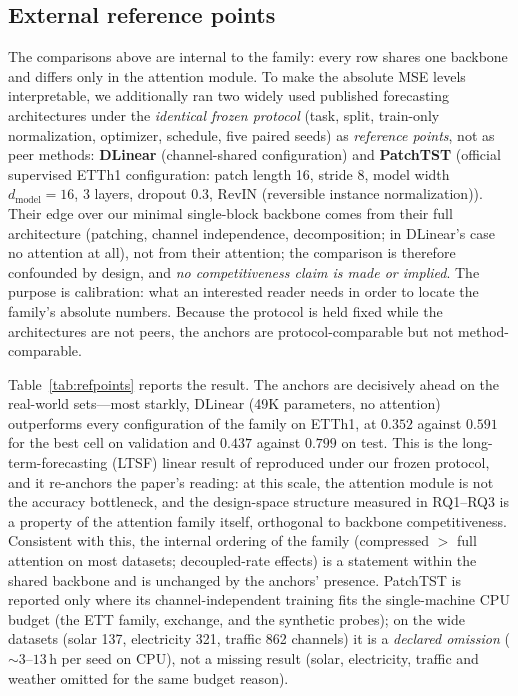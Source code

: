 \subsection{External reference points}
\label{sec:refpoints}
The comparisons above are internal to the family: every row shares one
backbone and differs only in the attention module. To make the absolute
MSE levels interpretable, we additionally ran two widely used published
forecasting architectures under the \emph{identical frozen protocol} (task,
split, train-only normalization, optimizer, schedule, five paired seeds) as
\emph{reference points}, not as peer methods: \textbf{DLinear}
\citep{zeng2023dlinear} (channel-shared configuration) and \textbf{PatchTST}
\citep{nie2023patchtst} (official supervised ETTh1 configuration: patch
length 16, stride 8, model width $d_{\mathrm{model}}=16$, 3 layers, dropout
0.3, RevIN (reversible instance normalization)). Their edge
over our minimal single-block backbone comes from their full architecture
(patching, channel independence, decomposition; in DLinear's case no
attention at all), not from their attention; the comparison is therefore
confounded by design, and \emph{no competitiveness claim is made or
implied}. The purpose is calibration: what an interested reader needs in
order to locate the family's absolute numbers. Because the protocol is held
fixed while the architectures are not peers, the anchors are
protocol-comparable but not method-comparable.

Table~\ref{tab:refpoints} reports the result. The anchors are decisively
ahead on the real-world sets---most starkly, DLinear (49K parameters, no
attention) outperforms every configuration of the family on ETTh1, at $0.352$
against $0.591$ for the best cell on validation and $0.437$ against $0.799$ on
test. This is the long-term-forecasting (LTSF) linear result of \citet{zeng2023dlinear}
reproduced under our frozen protocol, and it re-anchors the paper's reading:
at this scale, the attention module is not the accuracy bottleneck, and the
design-space structure measured in RQ1--RQ3 is a property of the attention
family itself, orthogonal to backbone competitiveness. Consistent with this,
the internal ordering of the family (compressed $>$ full attention on most
datasets; decoupled-rate effects) is a statement within the shared backbone
and is unchanged by the anchors' presence. PatchTST is reported only where
its channel-independent training fits the single-machine CPU budget (the
ETT family, exchange, and the synthetic probes); on the wide datasets
(solar 137, electricity 321, traffic 862 channels) it is a \emph{declared
omission} (${\sim}3$--$13$\,h per seed on CPU), not a missing result (solar, electricity, traffic and weather omitted for the same budget reason).


